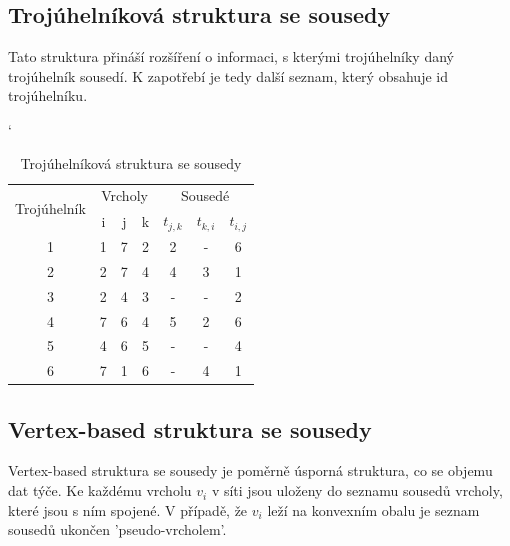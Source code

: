 \documentclass[12pt,a4paper]{article}
\begin{document}
\subsection{Trojúhelníková struktura se sousedy}

Tato struktura přináší rozšíření o informaci, s kterými trojúhelníky daný trojúhelník sousedí. K zapotřebí je tedy další seznam, který obsahuje id trojúhelníku.

\begin{table}[h]
\catcode`
\begin{tabular}{|c||c|c|c||c|c|c|}
\hline
\multirow{2}{*}{Trojúhelník} & \multicolumn{3}{|c|}{Vrcholy} & \multicolumn{3}{|c|}{Sousedé}      \\ \cline{2-7} 
                             & i        & j       & k       & $t_{j,k}$ & $t_{k,i}$ & $t_{i,j}$ \\ \hline \hline
1                            & 1        & 7       & 2       & 2         & -         & 6         \\ \hline
2                            & 2        & 7       & 4       & 4         & 3         & 1         \\ \hline
3                            & 2        & 4       & 3       & -         & -         & 2         \\ \hline
4                            & 7        & 6       & 4       & 5         & 2         & 6         \\ \hline
5                            & 4        & 6       & 5       & -         & -         & 4         \\ \hline
6                            & 7        & 1       & 6       & -         & 4         & 1         \\ \hline
\end{tabular}
\caption{Trojúhelníková struktura se sousedy}
\label{tab:troj_strukt_sous}
\end{table}

\subsection{Vertex-based struktura se sousedy}

Vertex-based struktura se sousedy je poměrně úsporná struktura, co se objemu dat týče. Ke každému vrcholu $v_i$ v síti jsou uloženy do seznamu sousedů vrcholy, které jsou s ním spojené. V případě, že $v_i$ leží na konvexním obalu je seznam sousedů ukončen 'pseudo-vrcholem'. 
\end{document}
